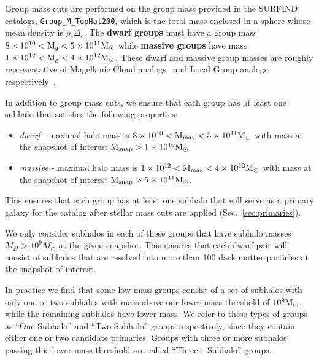 \documentclass[twocolumn]{aastex63}
\newcommand\msun{\rm{M}_{\odot}}
\begin{document}
Group mass cuts are performed on the group mass provided in the SUBFIND catalogs, \texttt{Group\_M\_TopHat200}, which is the total mass enclosed in a sphere whose mean density is $\rho_c \Delta_c$. The {\bf dwarf groups} must have a group mass $8\times10^{10} < \rm M_g < 5\times10^{11} M_\odot$ while {\bf massive groups} have mass $1\times10^{12} < \rm M_g < 4\times10^{12} M_\odot$. These dwarf and massive group masses are roughly representative of Magellanic Cloud analogs~\citep{besla12,moster13} and Local Group analogs respectively~\citep{vdm12ii}.

In addition to %
group mass cuts, we ensure that each group has at least one subhalo that satisfies the following properties:
\begin{itemize}
    \item \textit{dwarf} - maximal halo mass is $8\times10^{10} < \rm M_{\rm max} < 5\times10^{11} \rm M_\odot$ with mass at the snapshot of interest M$_{\rm snap} > 1\times10^{10} \rm M_\odot$
    \item \textit{massive} - maximal halo mass is $1\times10^{12} < \rm M_{max} < 4\times10^{12} \rm M_\odot$ with mass at the snapshot of interest M$_{\rm snap} > 5\times10^{11} \rm M_\odot$. 
\end{itemize}
This ensures that each group has at least one subhalo that will serve as a primary galaxy for the catalog after stellar mass cuts are applied (Sec.~\ref{sec:primaries}).

We only consider subhalos in each of these groups that have subhalo masses $M_{H}>10^9M_{\odot}$ at the given snapshot. This ensures that each dwarf pair will consist of subhalos that are resolved into more than 100 dark matter particles at the snapshot of interest. 

In practice we find that some low mass groups consist of a set of subhalos with only one or two subhalos with mass above our lower mass threshold of $10^9\msun$, while the remaining subhalos have lower mass. We refer to these types of groups as ``One Subhalo'' and ``Two Subhalo'' groups respectively, since they contain either one or two candidate primaries. Groups with three or more subhalos passing this lower mass threshold are called ``Three+ Subhalo'' groups. 
\end{document}
